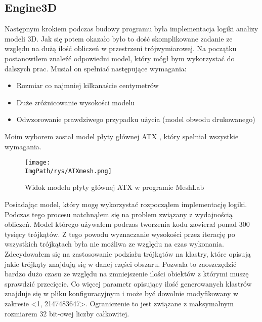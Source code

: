\documentclass[a4paper,12pt,twoside,openany]{report}
\newcommand{\ImgPath}{.}
\begin{document}
    \subsection{Engine3D}
      Następnym krokiem podczas budowy programu była implementacja logiki analizy modeli 3D. Jak się potem okazało 
      było to dość skomplikowane zadanie ze względu na dużą ilość obliczeń w przestrzeni trójwymiarowej.
      Na początku postanowiłem znaleźć odpowiedni model, który mógł bym wykorzystać do dalszych prac.
      Musiał on spełniać następujące wymagania:
      \begin{itemize}
        \item Rozmiar co najmniej kilkanaście centymetrów
        \item Duże zróżnicowanie wysokości modelu
        \item Odwzorowanie prawdziwego przypadku użycia (model obwodu drukowanego)
      \end{itemize}
      Moim wyborem został model płyty głównej ATX \cite{ATXMotherboard}, który spełniał wszystkie wymagania.
      \begin{figure}[!htbp]
        \begin{center}
      \centering
      \texttt{[image: \\ImgPath/rys/ATXmesh.png]}
      \end{center}
        \caption{Widok modelu płyty głównej ATX w programie MeshLab}
        \label{MeshLabATX}
      \end{figure}
      \clearpage
      Posiadając model, który mogę wykorzystać rozpocząłem implementację logiki. Podczas tego procesu 
      natchnąłem się na problem związany z wydajnością obliczeń. Model którego używałem podczas 
      tworzenia kodu zawierał ponad 300 tysięcy trójkątów. Z tego powodu wyznaczanie wysokości przez 
      iterację po wszystkich trójkątach była nie możliwa ze względu na czas wykonania. Zdecydowałem 
      się na zastosowanie podziału trójkątów na klastry, które opisują jakie trójkąty znajdują się 
      w danej części obszaru. Pozwala to zaoszczędzić bardzo dużo czasu ze względu na zmniejszenie 
      ilości obiektów z którymi muszę sprawdzić przecięcie. Co więcej parametr opisujący ilość generowanych 
      klastrów znajduje się w pliku konfiguracyjnym i może być dowolnie modyfikowany w zakresie <1, 2147483647>. 
      Ograniczenie to jest związane z maksymalnym rozmiarem 32 bit-owej liczby całkowitej.
      \noindent
\end{document}
